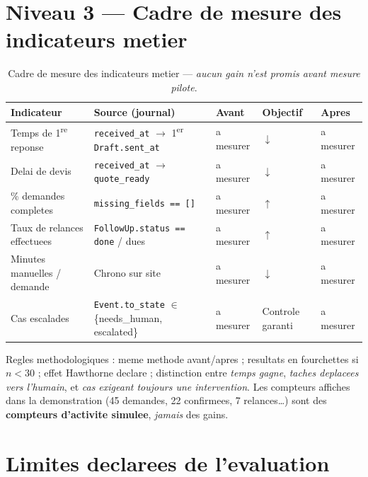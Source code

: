 \documentclass[12pt,a4paper,openany]{report}
\begin{document}
\section{Niveau 3 --- Cadre de mesure des indicateurs metier}

\begin{table}[H]\centering\small
\caption{Cadre de mesure des indicateurs metier --- \emph{aucun gain n'est promis avant mesure pilote}.}
\label{tab:kpi}
\begin{tabularx}{\textwidth}{X l l l l}\toprule
\rowcolor{boxBlue!30}\textbf{Indicateur} & \textbf{Source (journal)} & \textbf{Avant} & \textbf{Objectif} & \textbf{Apres}\\\midrule
Temps de 1\textsuperscript{re} reponse   & \texttt{received\_at} $\rightarrow$ 1\textsuperscript{er} \texttt{Draft.sent\_at} & a mesurer & $\downarrow$ & a mesurer\\
Delai de devis                           & \texttt{received\_at} $\rightarrow$ \texttt{quote\_ready} & a mesurer & $\downarrow$ & a mesurer\\
\% demandes completes                    & \texttt{missing\_fields == []} & a mesurer & $\uparrow$ & a mesurer\\
Taux de relances effectuees              & \texttt{FollowUp.status == done} / dues & a mesurer & $\uparrow$ & a mesurer\\
Minutes manuelles / demande              & Chrono sur site & a mesurer & $\downarrow$ & a mesurer\\
Cas escalades                            & \texttt{Event.to\_state} $\in$ \{needs\_human, escalated\} & a mesurer & Controle garanti & a mesurer\\
\bottomrule
\end{tabularx}
\end{table}

Regles methodologiques : meme methode avant/apres ; resultats en fourchettes si $n < 30$ ; effet Hawthorne declare ; distinction entre \emph{temps gagne}, \emph{taches deplacees vers l'humain}, et \emph{cas exigeant toujours une intervention}. Les compteurs affiches dans la demonstration (45 demandes, 22 confirmees, 7 relances\dots) sont des \textbf{compteurs d'activite simulee}, \emph{jamais} des gains.

\section{Limites declarees de l'evaluation}
\end{document}
